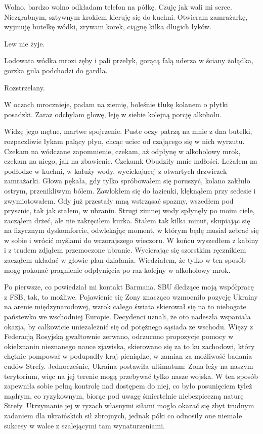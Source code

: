 \documentclass[../MAIN.tex]{subfiles}
\begin{document}
Wolno, bardzo wolno odkładam telefon na półkę. Czuję jak wali
mi serce. Niezgrabnym, sztywnym krokiem kieruję się do kuchni.
Otwieram zamrażarkę, wyjmuję butelkę wódki, zrywam korek,
ciągnę kilka długich łyków.

Lew nie żyje.

Lodowata wódka mrozi zęby i pali przełyk, gorącą falą uderza w
ściany żołądka, gorzka gula podchodzi do gardła.

Rozstrzelany.

W oczach mrocznieje, padam na ziemię, boleśnie tłukę kolanem o
płytki posadzki. Zaraz odchylam głowę, leję w siebie kolejną
porcję alkoholu.

Widzę jego mętne, martwe spojrzenie. Puste oczy patrzą na mnie
z dna butelki, rozpaczliwie łykam palący płyn, chcąc uciec od
czającego się w nich wyrzutu. Czekam na wódczane zapomnienie,
czekam, aż odpłynę w alkoholowy mrok, czekam na niego, jak na
zbawienie. \mbox{Czekam\3k}
%
%
Obudziły mnie mdłości. Leżałem na podłodze w kuchni, w kałuży
wody, wyciekającej z otwartych drzwiczek zamrażarki. Głowa
pękała, gdy tylko spróbowałem się poruszyć, kolano zakłuło
ostrym, przenikliwym bólem. Zawlokłem się do łazienki,
klęknąłem przy sedesie i zwymiotowałem. Gdy już przestały mną
wstrząsać spazmy, wszedłem pod prysznic, tak jak stałem, w
ubraniu. Strugi zimnej wody spłynęły po moim ciele, zacząłem
drżeć, ale nie zakręciłem kurka. Stałem tak kilka minut,
skupiając się na fizycznym dyskomforcie, odwlekając moment, w
którym będę musiał zebrać się w sobie i wrócić myślami do
wczorajszego wieczoru. W końcu wyszedłem z kabiny i z trudem
zdjąłem przemoczone ubranie. Wycierając się szorstkim
ręcznikiem zacząłem układać w głowie plan działania.
Wiedziałem, że tylko w ten sposób mogę pokonać pragnienie
odpłynięcia po raz kolejny w alkoholowy mrok.

Po pierwsze, co powiedział mi kontakt Barmana. SBU śledzące
moją współpracę z FSB, tak, to możliwe. Pojawienie się Zony
znacząco wzmocniło pozycję Ukrainy na arenie międzynarodowej,
wzrok całego świata skierował się na to niebogate państewko we
wschodniej Europie. Decydenci uznali, że oto nadeszła wspaniała
okazja, by całkowicie uniezależnić się od potężnego sąsiada ze
wschodu. Więzy z Federacją Rosyjską gwałtownie zerwano,
odrzucono propozycje pomocy w okiełznaniu nieznanego nauce
zjawiska, skierowano się za to ku zachodowi, który chętnie
pompował w podupadły kraj pieniądze, w zamian za możliwość
badania cudów Strefy. Jednocześnie, Ukraina postawiła
ultimatum: Zona leży na naszym terytorium, więc na jej terenie
mogą przebywać tylko nasze wojska. W ten sposób zapewniła sobie
pełną kontrolę nad dostępem do niej, co było posunięciem tyleż
mądrym, co ryzykownym, biorąc pod uwagę śmiertelnie
niebezpieczną naturę Strefy. Utrzymanie jej w ryzach własnymi
siłami mogło okazać się zbyt trudnym zadaniem dla ukraińskich
sił zbrojnych, jednak póki co odnosiły one niemałe sukcesy w
walce z szalejącymi tam wynaturzeniami.
\end{document}
